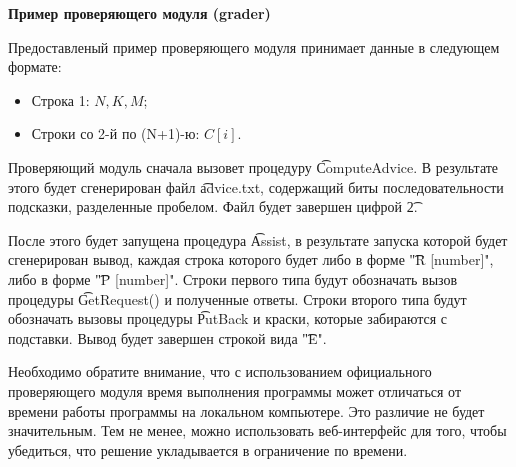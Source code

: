 \bf{Пример проверяющего модуля (grader)}

Предоставленый пример проверяющего модуля принимает данные в следующем формате:

\begin{itemize}
\item Строка 1: $N, K, M$;
\item Строки со 2-й по (N+1)-ю: $C[i]$.
\end{itemize}

Проверяющий модуль сначала вызовет процедуру \t{ComputeAdvice}. В результате этого будет сгенерирован файл \t{advice.txt}, содержащий биты последовательности подсказки, разделенные пробелом. Файл будет завершен цифрой \t{2}.

После этого будет запущена процедура \t{Assist}, в результате запуска которой будет сгенерирован вывод, каждая строка которого будет либо в форме \t{"R [number]"}, либо в форме \t{"P [number]"}. Строки первого типа будут обозначать вызов процедуры \t{GetRequest()} и полученные ответы. Строки второго типа будут обозначать вызовы процедуры \t{PutBack} и краски, которые забираются с подставки. Вывод будет завершен строкой вида \t{"E"}.

Необходимо обратите внимание, что с использованием официального проверяющего модуля время выполнения программы может отличаться от времени работы программы на локальном компьютере. Это различие не будет значительным. Тем не менее, можно использовать веб-интерфейс для того, чтобы убедиться, что решение укладывается в ограничение по времени.
